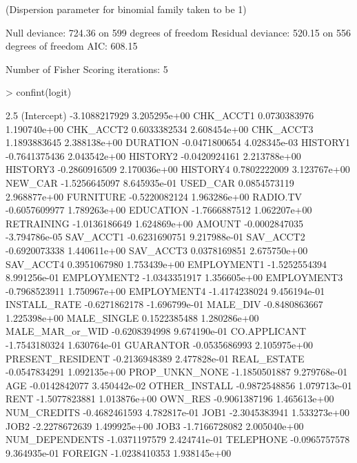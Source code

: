 \documentclass{article}
\begin{document}
\begin{Schunk}
\begin{Soutput}
(Dispersion parameter for binomial family taken to be 1)

    Null deviance: 724.36  on 599  degrees of freedom
Residual deviance: 520.15  on 556  degrees of freedom
AIC: 608.15

Number of Fisher Scoring iterations: 5
\end{Soutput}
\begin{Sinput}
> confint(logit)
\end{Sinput}
\begin{Soutput}
                         2.5 %
(Intercept)      -3.1088217929  3.205295e+00
CHK_ACCT1         0.0730383976  1.190740e+00
CHK_ACCT2         0.6033382534  2.608454e+00
CHK_ACCT3         1.1893883645  2.388138e+00
DURATION         -0.0471800654  4.028345e-03
HISTORY1         -0.7641375436  2.043542e+00
HISTORY2         -0.0420924161  2.213788e+00
HISTORY3         -0.2860916509  2.170036e+00
HISTORY4          0.7802222009  3.123767e+00
NEW_CAR          -1.5256645097  8.645935e-01
USED_CAR          0.0854573119  2.968877e+00
FURNITURE        -0.5220082124  1.963286e+00
RADIO.TV         -0.6057609977  1.789263e+00
EDUCATION        -1.7666887512  1.062207e+00
RETRAINING       -1.0136186649  1.624869e+00
AMOUNT           -0.0002847035 -3.794786e-05
SAV_ACCT1        -0.6231690751  9.217988e-01
SAV_ACCT2        -0.6920073338  1.440611e+00
SAV_ACCT3         0.0378169851  2.675750e+00
SAV_ACCT4         0.3951067980  1.753439e+00
EMPLOYMENT1      -1.5252554394  8.991256e-01
EMPLOYMENT2      -1.0343351917  1.356605e+00
EMPLOYMENT3      -0.7968523911  1.750967e+00
EMPLOYMENT4      -1.4174238024  9.456194e-01
INSTALL_RATE     -0.6271862178 -1.696799e-01
MALE_DIV         -0.8480863667  1.225398e+00
MALE_SINGLE       0.1522385488  1.280286e+00
MALE_MAR_or_WID  -0.6208394998  9.674190e-01
CO.APPLICANT     -1.7543180324  1.630764e-01
GUARANTOR        -0.0535686993  2.105975e+00
PRESENT_RESIDENT -0.2136948389  2.477828e-01
REAL_ESTATE      -0.0547834291  1.092135e+00
PROP_UNKN_NONE   -1.1850501887  9.279768e-01
AGE              -0.0142842077  3.450442e-02
OTHER_INSTALL    -0.9872548856  1.079713e-01
RENT             -1.5077823881  1.013876e+00
OWN_RES          -0.9061387196  1.465613e+00
NUM_CREDITS      -0.4682461593  4.782817e-01
JOB1             -2.3045383941  1.533273e+00
JOB2             -2.2278672639  1.499925e+00
JOB3             -1.7166728082  2.005040e+00
NUM_DEPENDENTS   -1.0371197579  2.424741e-01
TELEPHONE        -0.0965757578  9.364935e-01
FOREIGN          -1.0238410353  1.938145e+00
\end{Soutput}

\end{Schunk}
\end{document}
